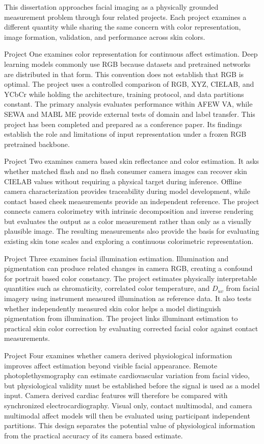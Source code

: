 \documentclass[12pt]{article}
\begin{document}
This dissertation approaches facial imaging as a physically grounded measurement problem through four related projects. Each project examines a different quantity while sharing the same concern with color representation, image formation, validation, and performance across skin colors.

Project One examines color representation for continuous affect estimation. Deep learning models commonly use RGB because datasets and pretrained networks are distributed in that form. This convention does not establish that RGB is optimal. The project uses a controlled comparison of RGB, XYZ, CIELAB, and YCbCr while holding the architecture, training protocol, and data partitions constant. The primary analysis evaluates performance within AFEW VA, while SEWA and MABL ME provide external tests of domain and label transfer. This project has been completed and prepared as a conference paper. Its findings establish the role and limitations of input representation under a frozen RGB pretrained backbone.

Project Two examines camera based skin reflectance and color estimation. It asks whether matched flash and no flash consumer camera images can recover skin CIELAB values without requiring a physical target during inference. Offline camera characterization provides traceability during model development, while contact based cheek measurements provide an independent reference. The project connects camera colorimetry with intrinsic decomposition and inverse rendering but evaluates the output as a color measurement rather than only as a visually plausible image. The resulting measurements also provide the basis for evaluating existing skin tone scales and exploring a continuous colorimetric representation.

Project Three examines facial illumination estimation. Illumination and pigmentation can produce related changes in camera RGB, creating a confound for portrait based color constancy. The project estimates physically interpretable quantities such as chromaticity, correlated color temperature, and \(D_{uv}\) from facial imagery using instrument measured illumination as reference data. It also tests whether independently measured skin color helps a model distinguish pigmentation from illumination. The project links illuminant estimation to practical skin color correction by evaluating corrected facial color against contact measurements.

Project Four examines whether camera derived physiological information improves affect estimation beyond visible facial appearance. Remote photoplethysmography can estimate cardiovascular variation from facial video, but physiological validity must be established before the signal is used as a model input. Camera derived cardiac features will therefore be compared with synchronized electrocardiography. Visual only, contact multimodal, and camera multimodal affect models will then be evaluated using participant independent partitions. This design separates the potential value of physiological information from the practical accuracy of its camera based estimate.
\end{document}
